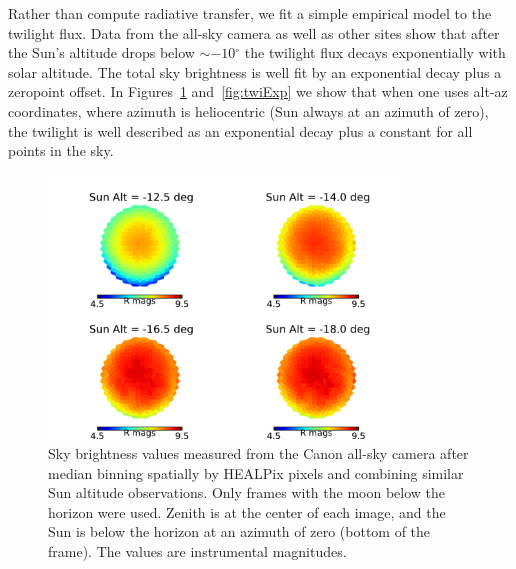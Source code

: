 \documentclass[]{spie}
\newcommand\degree{{^\circ}}
\begin{document}
Rather than compute radiative transfer, we fit a simple empirical model to the twilight flux.  Data from the all-sky camera as well as other sites show that after the Sun's altitude drops below $\sim-10\degree$ the twilight flux decays exponentially with solar altitude. The total sky brightness is well fit by an exponential decay plus a zeropoint offset.  In Figures~\ref{fig:twiSky} and~\ref{fig:twiExp} we show that when one uses alt-az coordinates, where azimuth is heliocentric (Sun always at an azimuth of zero), the twilight is well described as an exponential decay plus a constant for all points in the sky.  %



\begin{figure}[ht]
  \begin{center}
  \includegraphics[height=7cm]{plots/twiExamples.pdf}
  \end{center}
  \caption{Sky brightness values measured from the Canon all-sky camera after median binning spatially by HEALPix pixels and combining similar Sun altitude observations. Only frames with the moon below the horizon were used. Zenith is at the center of each image, and the Sun is below the horizon at an azimuth of zero (bottom of the frame). The values are instrumental magnitudes.  \label{fig:twiSky}}
\end{figure}
\end{document}
